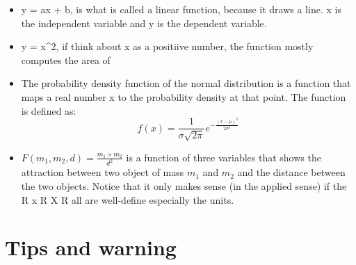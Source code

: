 \documentclass[
  letterpaper,
  DIV=11,
  numbers=noendperiod]{scrreprt}
\providecommand{\tightlist}{%
  \setlength{\itemsep}{0pt}\setlength{\parskip}{0pt}}
\begin{document}
\begin{itemize}
\tightlist
\item
  y = ax + b, is what is called a linear function, because it draws a
  line. x is the independent variable and y is the dependent variable.
\item
  y = x\^{}2, if think about x as a positiive number, the function
  mostly computes the area of
\item
  The probability density function of the normal distribution is a
  function that maps a real number x to the probability density at that
  point. The function is defined as:
  \[f(x) = \frac{1}{\sigma \sqrt{2\pi}} e^{-\frac{(x - \mu)^2}{2\sigma^2}}\]
\item
  \(F(m_1, m_2, d) = \frac{m_1 \times m_2}{d^2}\) is a function of three
  variables that shows the attraction between two object of mass \(m_1\)
  and \(m_2\) and the distance between the two objects. Notice that it
  only makes sense (in the applied sense) if the R x R X R all are
  well-define especially the units.
\end{itemize}

\section*{Tips and warning}\label{tips-and-warning-6}

\end{document}
